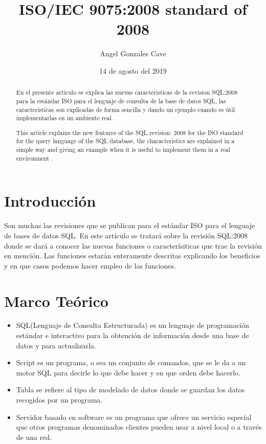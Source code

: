 \documentclass[twoside,twocolumn]{article}
\begin{document}
\title{ISO/IEC 9075:2008 standard of 2008}
\author{Angel Gonzales Cave}
\date {14 de agosto del 2019}
\maketitle

\begin{abstract}
En el presente artículo se explica las nuevas caracteristicas de la revision SQL:2008 para la estándar ISO para el lenguaje de consulta de la base de datos SQL, las características son  explicadas de forma sencilla y dando un ejemplo cuando es útil implementarlas en un ambiente real.
\end{abstract}
\begin{abstract}
This article explains the new features of the SQL revision: 2008 for the ISO standard for the query language of the SQL database, the characteristics are explained in a simple way and giving an example when it is useful to implement them in a real environment .
\end{abstract}

\section{Introducción}
Son muchas las revisiones que se publican para el estándar ISO para el lenguaje de bases de datos SQL. En este artículo se tratará sobre la revisión SQL:2008 donde se dará a conocer las nuevas funciones o caracterísiticas que trae la revisión en mención. Las funciones estarán enteramente descritas explicando los beneficios y en que casos podemos hacer empleo de las funciones.
\section{Marco Teórico}
\begin{itemize}
\item SQL(Lenguaje de Consulta Estructurada) es un lenguaje de programación estándar e interactivo para la obtención de información desde una base de datos y para actualizarla.
\item Script es un programa, o sea un conjunto de comandos, que se le da a un motor SQL para decirle lo que debe hacer y en que orden debe hacerlo.
\item Tabla se refiere al tipo de modelado de datos donde se guardan los datos recogidos por un programa.
\item Servidor basado en software es un programa que ofrece un servicio especial que otros programas denominados clientes pueden usar a nivel local o a través de una red.
\end{itemize}
\end{document}

